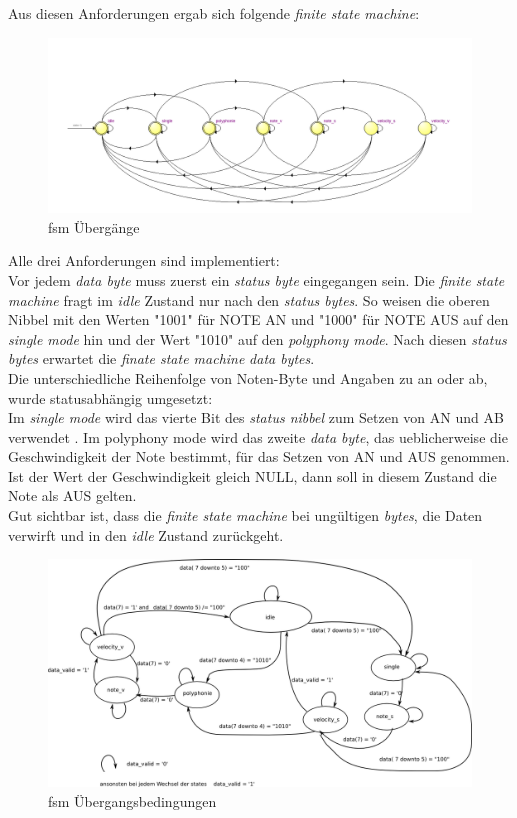 Aus diesen Anforderungen ergab sich folgende \textit{finite state machine}:

\begin{figure}[H]
	\centering
	\includegraphics[width=1\textwidth]{images/midi_control/fsm_midicontrol.png}
	\caption{fsm Übergänge}
	\label{fig.midi_fsm_inksape}
\end{figure}
Alle drei Anforderungen sind implementiert:\\
Vor jedem \textit{data byte} muss zuerst ein \textit{status byte} eingegangen sein. Die \textit{finite state machine} fragt im \textit{idle} Zustand nur nach den \textit{status bytes}. So weisen die oberen Nibbel mit den Werten "1001" für NOTE AN und "1000" für NOTE AUS auf den  \textit{single mode} hin und der Wert "1010" auf den \textit{polyphony mode}. Nach diesen \textit{status bytes} erwartet die \textit{finate state machine} \textit{data bytes}.\\ 
Die unterschiedliche Reihenfolge von Noten-Byte und Angaben zu an oder ab, wurde statusabhängig umgesetzt:\\
Im \textit{single mode} wird das vierte Bit des \textit{status nibbel} zum Setzen von AN und AB verwendet . Im polyphony mode wird das zweite \textit{data byte}, das ueblicherweise die Geschwindigkeit der Note bestimmt, für das Setzen von AN und AUS genommen. Ist der Wert der Geschwindigkeit gleich NULL, dann soll in diesem Zustand die Note als AUS gelten.\\
Gut sichtbar ist, dass die \textit{finite state machine} bei ungültigen \textit{bytes}, die Daten verwirft und in den \textit{idle} Zustand zurückgeht.\\

\begin{figure}[H]
	\centering
	\includegraphics[width=1\textwidth]{images/midi_control/fsm_midi_control_inkskape.png}
	\caption{fsm Übergangsbedingungen}
	\label{fig.midi_fsm_quartus}
\end{figure}

